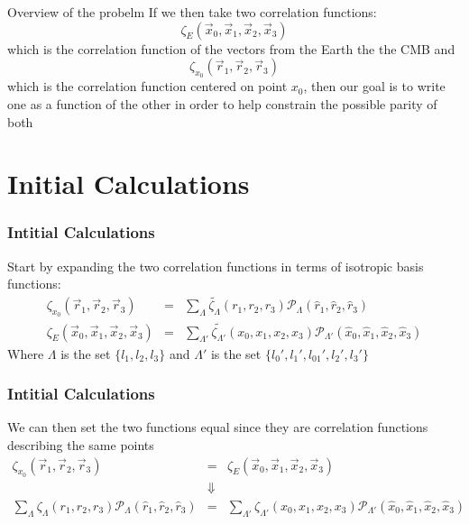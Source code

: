 \documentclass{beamer}
\begin{document}
\begin{frame}{Overview of the probelm}
    If we then take two correlation functions:
    \begin{equation*}
        \zeta_E (\vec x_0, \vec x_1, \vec x_2, \vec x_3)
    \end{equation*}
    which is the correlation function of the vectors from the Earth the the CMB and
    \begin{equation*}
        \zeta_{x_0} (\vec r_1, \vec r_2, \vec r_3)
    \end{equation*}
    which is the correlation function centered on point $x_0$, then our goal is to write one as a function of the other
    in order to help constrain the possible parity of both
\end{frame}

\section{Initial Calculations}
    \begin{frame}
        \frametitle{Intitial Calculations}
        Start by expanding the two correlation functions in terms of isotropic basis functions:
        \begin{eqnarray*}
            \zeta_{x_0} (\vec r_1, \vec r_2, \vec r_3) &=& \sum_{\Lambda} \tilde{\zeta_{\Lambda}}(r_1, r_2, r_3) \mathcal P_{\Lambda}(\hat r_1, \hat r_2, \hat r_3)\\
            \zeta_E (\vec x_0, \vec x_1, \vec x_2, \vec x_3) &=& \sum_{\Lambda '} \tilde{\zeta_{\Lambda '}}(x_0, x_1, x_2, x_3) \mathcal P_{\Lambda '}(\hat x_0, \hat x_1, \hat x_2, \hat x_3)
        \end{eqnarray*}
        Where $\Lambda$ is the set $\{l_1, l_2, l_3\}$ and $\Lambda'$ is the set $\{l_0', l_1', l_{01}', l_2', l_3'\}$
    \end{frame}

    \begin{frame}
        \frametitle{Intitial Calculations}
        We can then set the two functions equal since they are correlation functions describing the same points
        \begin{eqnarray*}
            \zeta_{x_0} (\vec r_1, \vec r_2, \vec r_3) &=& \zeta_E (\vec x_0, \vec x_1, \vec x_2, \vec x_3)\\
            &\Downarrow&\\
            \sum_{\Lambda} \zeta_{\Lambda}(r_1, r_2, r_3) \mathcal P_{\Lambda}(\hat r_1, \hat r_2, \hat r_3) &=& \sum_{\Lambda '} \zeta_{\Lambda '}(x_0, x_1, x_2, x_3) \mathcal P_{\Lambda '}(\hat x_0, \hat x_1, \hat x_2, \hat x_3)
        \end{eqnarray*}
    \end{frame}
\end{document}
